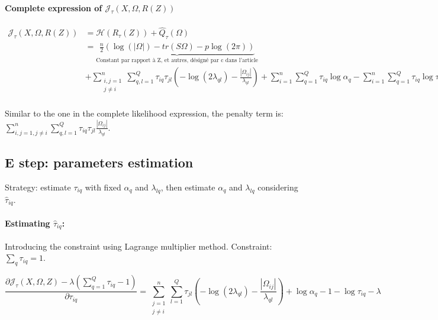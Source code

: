 \documentclass[10pt]{article}
\begin{document}
\paragraph{Complete expression of $\mathcal{J}_\tau(X, \Omega,  R(Z))$}

\begin{align*}
\mathcal{J}_\tau(X, \Omega,  R(Z)) &= \mathcal{H}(R_\tau (Z)) + \hat{Q}_\tau(\Omega) \\
	&=  \underbrace{\frac{n}{2} \left( \log(|\Omega|) - tr(S\Omega)  - p\log(2\pi) \right)}_{\text{Constant par rapport à Z, et autres, désigné par c dans l'article}} \\
	& + \sum_{\substack{i,j = 1 \\  j\neq i}}^n \sum_{q,l = 1}^Q\tau_{iq}\tau_{jl}\left( -\log (2\lambda_{ql}) - \frac{|\Omega_{ij}|}{\lambda_{ql}}\right)  +  \sum_{i = 1}^n \sum_{q = 1}^Q \tau_{iq} \log \alpha_q  - \sum_{i = 1}^n \sum_{q = 1}^Q  \tau_{iq} \log  \tau_{iq}\\
\end{align*}

Similar to the one in the complete likelihood expression, the penalty term is: $\sum_{i,j = 1,  j\neq i}^n \sum_{q,l = 1}^Q\tau_{iq}\tau_{jl}\frac{|\Omega_{ij}|}{\lambda_{ql}}$.

\subsection{E step: parameters estimation}

Strategy: estimate $\tau_{iq}$ with fixed $\alpha_{q}$ and $\lambda_{lq}$, then estimate  $\alpha_{q}$ and $\lambda_{lq}$ considering $\hat{\tau}_{iq}$.

\paragraph{Estimating $\hat{\tau}_{iq}$:}

Introducing the constraint using Lagrange multiplier method. Constraint: $\sum_q \tau_{iq} = 1$.

\[ \frac{\partial\mathcal{J}_\tau(X, \Omega, Z) - \lambda(\sum_{q=1}^{Q} \tau_{iq} - 1)}{\partial \tau_{iq}} = \sum_{\substack{j = 1 \\  j\neq i}}^n \sum_{l = 1}^Q \tau_{jl}\left( -\log (2\lambda_{ql}) - \frac{|\Omega_{ij}|}{\lambda_{ql}}\right)  + \log \alpha_q  - 1 - \log  \tau_{iq} - \lambda \]
\end{document}
